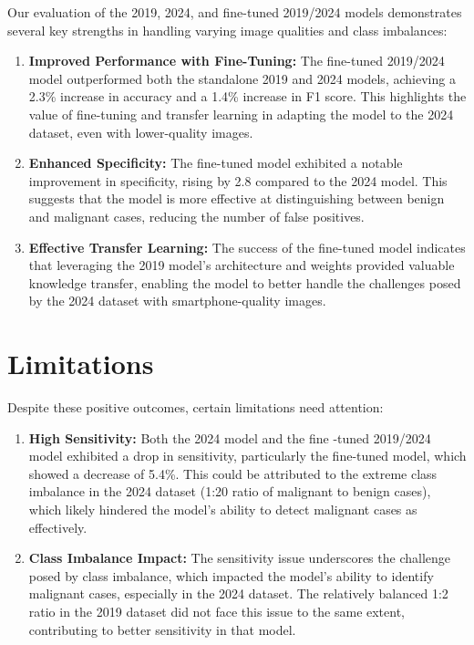 \documentclass{article}
\begin{document}
Our evaluation of the 2019, 2024, and fine-tuned 2019/2024 models demonstrates several key strengths in handling
varying image qualities and class imbalances:

\begin{enumerate}
    \item \textbf{Improved Performance with Fine-Tuning:} The fine-tuned 2019/2024 model outperformed both the
standalone 2019 and 2024 models, achieving a 2.3\% increase in accuracy and a 1.4\% increase in F1 score.
This highlights the value of fine-tuning and transfer learning in adapting the model to the 2024 dataset,
even with lower-quality images.
    \item \textbf{Enhanced Specificity:} The fine-tuned model exhibited a notable improvement in specificity, rising by 2.8%
compared to the 2024 model. This suggests that the model is more effective at distinguishing between
benign and malignant cases, reducing the number of false positives.
    \item \textbf{Effective Transfer Learning:} The success of the fine-tuned model indicates that leveraging the 2019
model’s architecture and weights provided valuable knowledge transfer, enabling the model to better
handle the challenges posed by the 2024 dataset with smartphone-quality images.
\end{enumerate}

\section{Limitations}

Despite these positive outcomes, certain limitations need attention:

\begin{enumerate}
    \item \textbf{High Sensitivity:} Both the 2024 model and the fine -tuned 2019/2024 model exhibited a drop in
sensitivity, particularly the fine-tuned model, which showed a decrease of 5.4\%. This could be attributed to
the extreme class imbalance in the 2024 dataset (1:20 ratio of malignant to benign cases), which likely
hindered the model’s ability to detect malignant cases as effectively.
    \item \textbf{Class Imbalance Impact:} The sensitivity issue underscores the challenge posed by class imbalance, which
impacted the model's ability to identify malignant cases, especially in the 2024 dataset. The relatively
balanced 1:2 ratio in the 2019 dataset did not face this issue to the same extent, contributing to better
sensitivity in that model.
\end{enumerate}
\end{document}
